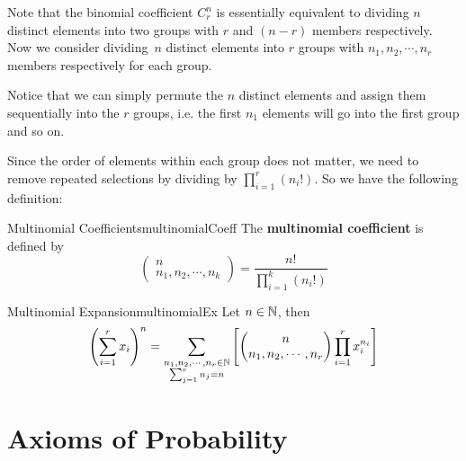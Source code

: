 \documentclass[math]{amznotes}
\theoremstyle{remark}
\begin{document}
Note that the binomial coefficient $C^n_r$ is essentially equivalent to dividing $n$ distinct elements into two groups with $r$ and $(n - r)$ members respectively. Now we consider dividing~$n$ distinct elements into $r$ groups with $n_1, n_2, \cdots, n_r$ members respectively for each group.

Notice that we can simply permute the $n$ distinct elements and assign them sequentially into the $r$ groups, i.e. the first $n_1$ elements will go into the first group and so on.

Since the order of elements within each group does not matter, we need to remove repeated selections by dividing by $\prod_{i = 1}^{r}(n_i!)$. So we have the following definition:
\begin{dfnbox}{Multinomial Coefficients}{multinomialCoeff}
    The {\color{red} \textbf{multinomial coefficient}} is defined by
    \begin{equation*}
        \begin{pmatrix}
            n \\
            n_1, n_2, \cdots, n_k
        \end{pmatrix} = \frac{n!}{\prod_{i = 1}^{k}\left(n_i!\right)}
    \end{equation*}
\end{dfnbox}
\begin{thmbox}{Multinomial Expansion}{multinomialEx}
    Let $n \in \mathbb{N}$, then 
    \begin{equation*}
        \left(\sum_{i = 1}^{r}x_i\right)^n = \sum_{
            \substack{
                n_1, n_2, \cdots, n_r \in \mathbb{N} \\
                \sum_{j = 1}^rn_j = n
            }
        } \left[\begin{pmatrix}
            n \\
            n_1, n_2, \cdots, n_r
        \end{pmatrix}\prod_{i = 1}^{r}x_i^{n_i}\right]
    \end{equation*}
\end{thmbox}

\chapter{Axioms of Probability}
\end{document}

